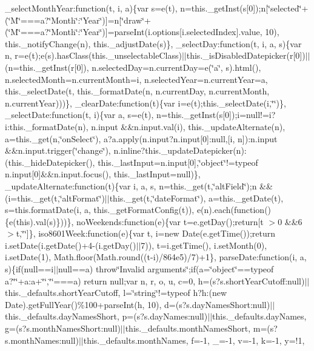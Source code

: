 \begin{DoxyCompactItemize}
\+\_\+select\+Month\+Year\+:function(t, i, a)\{var s=e(t), n=this.\+\_\+get\+Inst(s\mbox{[}0\mbox{]});n\mbox{[}\char`\"{}selected\char`\"{}+(\char`\"{}\+M\char`\"{}===a?\char`\"{}\+Month\char`\"{}\+:\char`\"{}\+Year\char`\"{})\mbox{]}=n\mbox{[}\char`\"{}draw\char`\"{}+(\char`\"{}\+M\char`\"{}===a?\char`\"{}\+Month\char`\"{}\+:\char`\"{}\+Year\char`\"{})\mbox{]}=parse\+Int(i.\+options\mbox{[}i.\+selected\+Index\mbox{]}.\+value, 10), this.\+\_\+notify\+Change(n), this.\+\_\+adjust\+Date(s)\}, \+\_\+select\+Day\+:function(t, i, a, s)\{var n, r=e(t);e(s).\+has\+Class(this.\+\_\+unselectable\+Class)$\vert$$\vert$this.\+\_\+is\+Disabled\+Datepicker(r\mbox{[}0\mbox{]})$\vert$$\vert$(n=this.\+\_\+get\+Inst(r\mbox{[}0\mbox{]}), n.\+selected\+Day=n.\+current\+Day=e(\char`\"{}a\char`\"{}, s).\+html(), n.\+selected\+Month=n.\+current\+Month=i, n.\+selected\+Year=n.\+current\+Year=a, this.\+\_\+select\+Date(t, this.\+\_\+format\+Date(n, n.\+current\+Day, n.\+current\+Month, n.\+current\+Year)))\}, \+\_\+clear\+Date\+:function(t)\{var i=e(t);this.\+\_\+select\+Date(i,\char`\"{}\char`\"{})\}, \+\_\+select\+Date\+:function(t, i)\{var a, s=e(t), n=this.\+\_\+get\+Inst(s\mbox{[}0\mbox{]});i=null!=i?i\+:this.\+\_\+format\+Date(n), n.\+input \&\&n.\+input.\+val(i), this.\+\_\+update\+Alternate(n), a=this.\+\_\+get(n,\char`\"{}on\+Select\char`\"{}), a?a.\+apply(n.\+input?n.\+input\mbox{[}0\mbox{]}\+:null,\mbox{[}i, n\mbox{]})\+:n.\+input \&\&n.\+input.\+trigger(\char`\"{}change\char`\"{}), n.\+inline?this.\+\_\+update\+Datepicker(n)\+:(this.\+\_\+hide\+Datepicker(), this.\+\_\+last\+Input=n.\+input\mbox{[}0\mbox{]},\char`\"{}object\char`\"{}!=typeof n.\+input\mbox{[}0\mbox{]}\&\&n.\+input.\+focus(), this.\+\_\+last\+Input=null)\}, \+\_\+update\+Alternate\+:function(t)\{var i, a, s, n=this.\+\_\+get(t,\char`\"{}alt\+Field\char`\"{});n \&\&(i=this.\+\_\+get(t,\char`\"{}alt\+Format\char`\"{})$\vert$$\vert$this.\+\_\+get(t,\char`\"{}date\+Format\char`\"{}), a=this.\+\_\+get\+Date(t), s=this.\+format\+Date(i, a, this.\+\_\+get\+Format\+Config(t)), e(n).\+each(function()\{e(this).\+val(s)\}))\}, no\+Weekends\+:function(e)\{var t=e.\+get\+Day();return\mbox{[}t $>$0 \&\&6 $>$t,\char`\"{}\char`\"{}\mbox{]}\}, iso8601\+Week\+:function(e)\{var t, i=new Date(e.\+get\+Time());return i.\+set\+Date(i.\+get\+Date()+4-\/(i.\+get\+Day()$\vert$$\vert$7)), t=i.\+get\+Time(), i.\+set\+Month(0), i.\+set\+Date(1), Math.\+floor(\+Math.\+round((t-\/i)/864e5)/7)+1\}, parse\+Date\+:function(i, a, s)\{if(null==i$\vert$$\vert$null==a) throw\char`\"{}\+Invalid arguments\char`\"{};if(a=\char`\"{}object\char`\"{}==typeof a?\char`\"{}\char`\"{}+a\+:a+\char`\"{}\char`\"{},\char`\"{}\char`\"{}===a) return null;var n, r, o, u, c=0, h=(s?s.\+short\+Year\+Cutoff\+:null)$\vert$$\vert$this.\+\_\+defaults.\+short\+Year\+Cutoff, l=\char`\"{}string\char`\"{}!=typeof h?h\+:(new Date).\+get\+Full\+Year()\%100+parse\+Int(h, 10), d=(s?s.\+day\+Names\+Short\+:null)$\vert$$\vert$this.\+\_\+defaults.\+day\+Names\+Short, p=(s?s.\+day\+Names\+:null)$\vert$$\vert$this.\+\_\+defaults.\+day\+Names, g=(s?s.\+month\+Names\+Short\+:null)$\vert$$\vert$this.\+\_\+defaults.\+month\+Names\+Short, m=(s?s.\+month\+Names\+:null)$\vert$$\vert$this.\+\_\+defaults.\+month\+Names, f=-\/1, \+\_\+=-\/1, v=-\/1, k=-\/1, y=!1, 
\end{DoxyCompactItemize}
